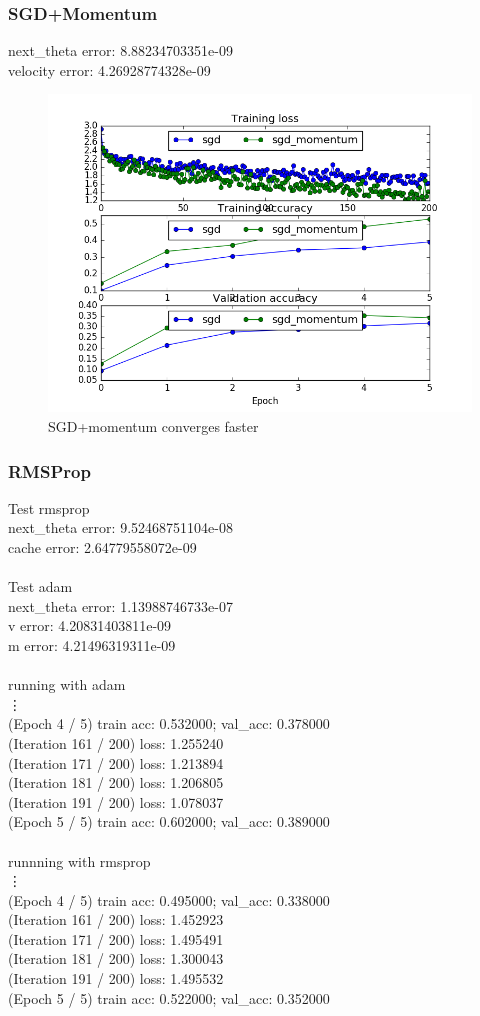 \documentclass{article}
\begin{document}
\subsubsection{SGD+Momentum}
{\footnotesize
next\_theta error:  8.88234703351e-09\\
velocity error:  4.26928774328e-09\\
}

\begin{figure}[H]
\centering
\includegraphics[width=0.5\linewidth]{./figure_3_1_10}
\caption{SGD+momentum converges faster}
\label{fig:3_1_10}
\end{figure}

\subsubsection{RMSProp}
{\footnotesize
Test rmsprop\\
next\_theta error:  9.52468751104e-08\\
cache error:  2.64779558072e-09\\
\\
Test adam\\
next\_theta error:  1.13988746733e-07\\
v error:  4.20831403811e-09\\
m error:  4.21496319311e-09\\
\\
running with adam\\
\vdots\\
(Epoch 4 / 5) train acc: 0.532000; val\_acc: 0.378000\\
(Iteration 161 / 200) loss: 1.255240\\
(Iteration 171 / 200) loss: 1.213894\\
(Iteration 181 / 200) loss: 1.206805\\
(Iteration 191 / 200) loss: 1.078037\\
(Epoch 5 / 5) train acc: 0.602000; val\_acc: 0.389000\\
\\
runnning with rmsprop\\
\vdots\\
(Epoch 4 / 5) train acc: 0.495000; val\_acc: 0.338000\\
(Iteration 161 / 200) loss: 1.452923\\
(Iteration 171 / 200) loss: 1.495491\\
(Iteration 181 / 200) loss: 1.300043\\
(Iteration 191 / 200) loss: 1.495532\\
(Epoch 5 / 5) train acc: 0.522000; val\_acc: 0.352000\\
}
\end{document}

